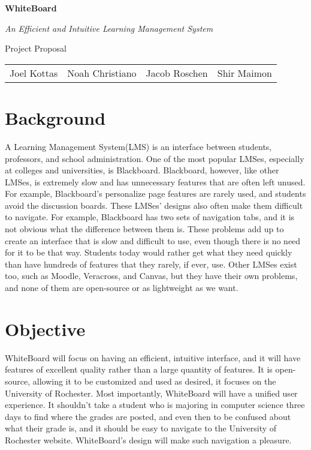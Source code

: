 \documentclass{article}
\begin{document}
\begin{center}
    \huge{\textbf{WhiteBoard}}
    
    \huge{\textit{An Efficient and Intuitive Learning Management System}}

    \huge{Project Proposal}

    \vspace{10 pt}

    \large{
        \begin{tabular}{cccc}
            Joel Kottas&Noah Christiano&Jacob Roschen&Shir Maimon\\
        \end{tabular}
    }

\end{center}

\vspace{10 pt}

\section{Background}

A Learning Management System(LMS) is an interface between students, professors,
and school administration. One of the most popular LMSes, especially at
colleges and universities, is Blackboard. Blackboard, however, like other
LMSes, is extremely slow and has unnecessary features that are often left
unused. For example, Blackboard’s personalize page features are rarely used,
and students avoid the discussion boards. These LMSes’ designs also often make
them difficult to navigate. For example, Blackboard has two sets of navigation
tabs, and it is not obvious what the difference between them is. These problems
add up to create an interface that is slow and difficult to use, even though
there is no need for it to be that way. Students today would rather get what
they need quickly than have hundreds of features that they rarely, if ever,
use. Other LMSes exist too, such as Moodle, Veracross, and Canvas, but they
have their own problems, and none of them are open-source or as lightweight as
we want.

\section{Objective}

WhiteBoard will focus on having an efficient, intuitive interface, and it will
have features of excellent quality rather than a large quantity of features. It
is open-source, allowing it to be customized and used as desired, it focuses on
the University of Rochester. Most importantly, WhiteBoard will have a unified
user experience. It shouldn’t take a student who is majoring in computer
science three days to find where the grades are posted, and even then to be
confused about what their grade is, and it should be easy to navigate to the
University of Rochester website. WhiteBoard’s design will make such navigation
a pleasure.
\end{document}
